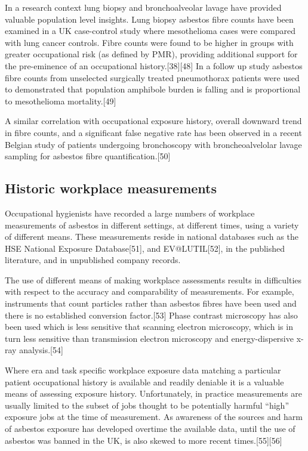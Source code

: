 \documentclass[12pt,a4paper,]{report}
\begin{document}
In a research context lung biopsy and bronchoalveolar lavage have
provided valuable population level insights. Lung biopsy asbestos fibre
counts have been examined in a UK case-control study where mesothelioma
cases were compared with lung cancer controls. Fibre counts were found
to be higher in groups with greater occupational risk (as defined by
PMR), providing additional support for the pre-eminence of an
occupational history.{[}38{]}{[}48{]} In a follow up study asbestos
fibre counts from unselected surgically treated pneumothorax patients
were used to demonstrated that population amphibole burden is falling
and is proportional to mesothelioma mortality.{[}49{]}

A similar correlation with occupational exposure history, overall
downward trend in fibre counts, and a significant false negative rate
has been observed in a recent Belgian study of patients undergoing
bronchoscopy with broncheoalvelolar lavage sampling for asbestos fibre
quantification.{[}50{]}

\hypertarget{historic-workplace-measurements}{%
\subsection{Historic workplace
measurements}\label{historic-workplace-measurements}}

Occupational hygienists have recorded a large numbers of workplace
measurements of asbestos in different settings, at different times,
using a variety of different means. These measurements reside in
national databases such as the HSE National Exposure Database{[}51{]},
and EV@LUTIL{[}52{]}, in the published literature, and in unpublished
company records.

The use of different means of making workplace assessments results in
difficulties with respect to the accuracy and comparability of
measurements. For example, instruments that count particles rather than
asbestos fibres have been used and there is no established conversion
factor.{[}53{]} Phase contrast microscopy has also been used which is
less sensitive that scanning electron microscopy, which is in turn less
sensitive than transmission electron microscopy and energy-dispersive
x-ray analysis.{[}54{]}

Where era and task specific workplace exposure data matching a
particular patient occupational history is available and readily
deniable it is a valuable means of assessing exposure history.
Unfortunately, in practice measurements are usually limited to the
subset of jobs thought to be potentially harmful ``high'' exposure jobs
at the time of measurement. As awareness of the sources and harm of
asbestos exposure has developed overtime the available data, until the
use of asbestos was banned in the UK, is also skewed to more recent
times.{[}55{]}{[}56{]}
\end{document}

